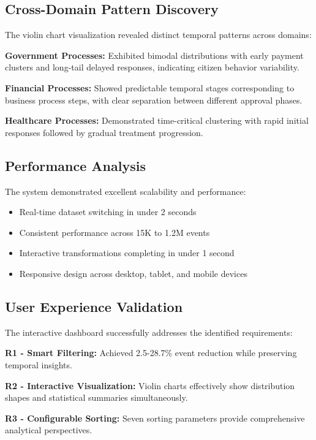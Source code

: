 \documentclass[11pt,a4paper]{article}
\begin{document}
\subsection{Cross-Domain Pattern Discovery}

The violin chart visualization revealed distinct temporal patterns across domains:

\textbf{Government Processes:} Exhibited bimodal distributions with early payment clusters and long-tail delayed responses, indicating citizen behavior variability.

\textbf{Financial Processes:} Showed predictable temporal stages corresponding to business process steps, with clear separation between different approval phases.

\textbf{Healthcare Processes:} Demonstrated time-critical clustering with rapid initial responses followed by gradual treatment progression.

\subsection{Performance Analysis}

The system demonstrated excellent scalability and performance:

\begin{itemize}
    \item Real-time dataset switching in under 2 seconds
    \item Consistent performance across 15K to 1.2M events
    \item Interactive transformations completing in under 1 second
    \item Responsive design across desktop, tablet, and mobile devices
\end{itemize}

\subsection{User Experience Validation}

The interactive dashboard successfully addresses the identified requirements:

\textbf{R1 - Smart Filtering:} Achieved 2.5-28.7\% event reduction while preserving temporal insights.

\textbf{R2 - Interactive Visualization:} Violin charts effectively show distribution shapes and statistical summaries simultaneously.

\textbf{R3 - Configurable Sorting:} Seven sorting parameters provide comprehensive analytical perspectives.
\end{document}
